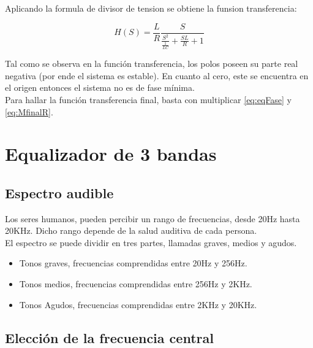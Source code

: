 \documentclass[../../tc_tp3_main.tex]{subfiles}
\begin{document}
Aplicando la formula de divisor de tension se obtiene la funsion transferencia:

\begin{equation}
H(S)=\frac{L}{R}\frac{S}{\frac{S^2}{\frac{1}{LC}}+\frac{SL}{R} +1}\label{eq:eqFase}
\end{equation}

Tal como se observa en la función transferencia, los polos poseen su parte real negativa (por ende el sistema es estable). En cuanto al cero, este se encuentra en el origen entonces el sistema no es de fase mínima.
\\
Para hallar la función transferencia final, basta con multiplicar \ref{eq:eqFase} y \ref{eq:MfinalR}.















\section{Equalizador de 3 bandas}

\subsection{Espectro audible}
Los seres humanos, pueden percibir un rango de frecuencias, desde 20Hz hasta 20KHz. Dicho rango depende de la salud auditiva de cada persona.
\\ El espectro se puede dividir en tres partes, llamadas graves, medios y agudos.

\begin{itemize}
  \item Tonos graves, frecuencias comprendidas entre 20Hz y 256Hz.
  \item Tonos medios, frecuencias comprendidas entre 256Hz y 2KHz.
  \item Tonos Agudos, frecuencias comprendidas entre 2KHz y 20KHz.
\end{itemize}
\subsection{Elección de la frecuencia central}
\end{document}
